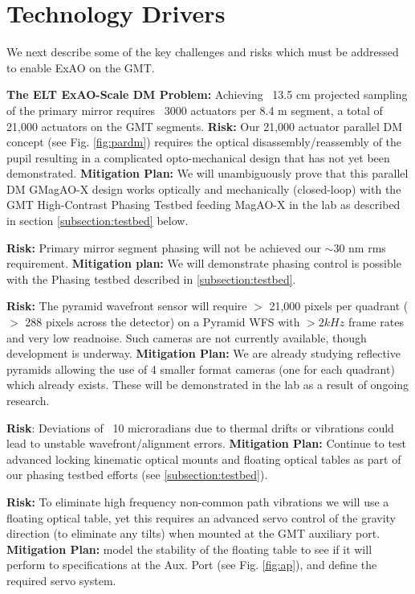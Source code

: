 \documentclass[12pt,preprint]{aastex}
\begin{document}
\section{Technology Drivers} 

We next describe some of the key challenges and risks which must be addressed to enable ExAO on the GMT.

\textbf{The ELT ExAO-Scale DM Problem:} Achieving ~13.5 cm projected sampling of the primary mirror requires ~3000 actuators per 8.4 m segment, a total of 21,000 actuators on the GMT segments. \textbf{Risk:} Our 21,000 actuator parallel DM concept (see Fig. \ref{fig:pardm}) requires the optical disassembly/reassembly of the pupil resulting in a complicated opto-mechanical design that has not yet been demonstrated. \textbf{Mitigation Plan:} We will unambiguously prove that this parallel DM GMagAO-X design works optically and mechanically (closed-loop) with the GMT High-Contrast Phasing Testbed feeding MagAO-X in the lab as described in section \ref{subsection:testbed} below. 

\textbf{Risk:} Primary mirror segment phasing will not be achieved our $\sim$30 nm rms requirement. \textbf{Mitigation plan:} We will demonstrate phasing control is possible with the Phasing testbed described in \ref{subsection:testbed}. 

\textbf{Risk:} The pyramid wavefront sensor will require $>$ 21,000 pixels per quadrant ($>$ 288 pixels across the detector) on a Pyramid WFS with $>2kHz$ frame rates and very low readnoise.  Such cameras are not currently available, though development is underway. \textbf{Mitigation Plan:}  We are already studying reflective pyramids allowing the use of 4 smaller format cameras (one for each quadrant) which already exists. These will be demonstrated in the lab as a result of ongoing research.

\textbf{Risk}: Deviations of ~10 microradians due to thermal drifts or vibrations could lead to unstable wavefront/alignment errors. \textbf{Mitigation Plan:} Continue to test advanced locking kinematic optical mounts and floating optical tables as part of our phasing testbed efforts (see \ref{subsection:testbed}).

\textbf{Risk:} To eliminate high frequency non-common path vibrations we will use a floating optical table, yet this requires an advanced servo control of the gravity direction (to eliminate any tilts) when mounted at the GMT auxiliary port. \textbf{Mitigation Plan:} model the stability of the floating table to see if it will perform to specifications at the Aux. Port (see Fig. \ref{fig:ap}), and define the required servo system.
\end{document}
